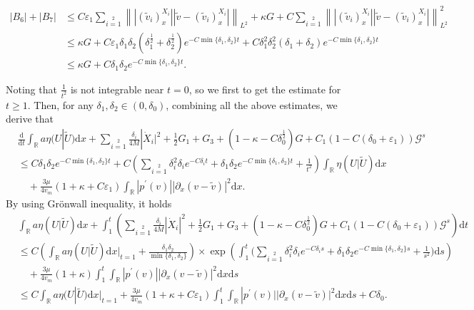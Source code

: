 \documentclass[10pt,reqno]{amsart}
\numberwithin{equation}{section}
\newcommand{\dif}{\mathrm{d}}
\begin{document}
\begin{align*}
|B_6|+|B_7|
&\le C\varepsilon_1\sum\limits_{i=1}\limits^2
\left\||(\widetilde{v}_i)^{X_i}_x||\widetilde{v}-(\widetilde{v}_i)^{X_i}_x|\right\|_{L^2}
+\kappa G+C\sum\limits_{i=1}\limits^2
\left\||(\widetilde{v}_i)^{X_i}_x||\widetilde{v}-(\widetilde{v}_i)^{X_i}_x|\right\|_{L^2}^2\\
&\le \kappa G+ C\varepsilon_1\delta_1\delta_2(\delta_1^{\frac{1}{2}}+\delta_2^{\frac{1}{2}})e^{-C\min\{\delta_1,\delta_2\}t}
+ C\delta_1^2\delta_2^2(\delta_1+\delta_2)e^{-C\min\{\delta_1,\delta_2\}t}\\
&\le \kappa G+ C\delta_1\delta_2e^{-C\min\{\delta_1,\delta_2\}t}.
\end{align*}

Noting that $\frac{1}{t^2}$ is not integrable near $t=0$, so we first to get the estimate for $t\ge 1$.  Then, for any $\delta_1, \delta_2\in(0, \delta_0)$, combining all the above estimates, we derive that
\begin{align*}
&\frac{\dif}{\dif t}\int_\mathbb{R}a\eta(U|\widetilde{U})\dif x
+\sum\limits_{i=1}\limits^2\frac{\delta_i}{4M}|\dot{X}_i|^2+\frac{1}{2}G_1+G_3
+(1-\kappa-C\delta^{\frac{1}{2}}_0)G
+C_1(1-C(\delta_0+\varepsilon_1))\mathcal{G}^s\\
&\le C\delta_1\delta_2e^{-C\min\{\delta_1,\delta_2\}t}
+C\left(\sum\limits_{i=1}\limits^2\delta_i^2\delta_ie^{-C\delta_i t}+\delta_1\delta_2e^{-C\min\{\delta_1,\delta_2\}t}+\frac{1}{t^2}\right)\int_{\mathbb{R}}\eta(U|\widetilde U)\dif x\\
&\quad+\frac{3\mu}{4v_m}(1+\kappa+C\varepsilon_1)\int_\mathbb{R}|p^\prime(v)||\partial_x(v-\widetilde{v})|^2\dif x.
\end{align*}
By using Gr\"onwall inequality, it holds
\begin{align*}
&\int_\mathbb{R}a\eta(U|\widetilde{U})\dif x
+\int_1^t\left(\sum\limits_{i=1}\limits^2\frac{\delta_i}{4M}|\dot{X}_i|^2+\frac{1}{2}G_1+G_3
+(1-\kappa-C\delta^{\frac{1}{2}}_0)G
+C_1(1-C(\delta_0+\varepsilon_1))\mathcal{G}^s\right)\dif t\\
&\le C\left(\int_{\mathbb{R}}a\eta(U|\widetilde U)\dif x\Big|_{t=1}+ \frac{\delta_1\delta_2}{\min\{\delta_1,\delta_2\}}\right)\times \exp\left(\int_1^t\Big(\sum\limits_{i=1}\limits^2\delta_i^2\delta_ie^{-C\delta_i s}+\delta_1\delta_2e^{-C\min\{\delta_1,\delta_2\}s}+\frac{1}{s^2}\Big)\dif s\right)\\
&\quad+\frac{3\mu}{4v_m}(1+\kappa)\int_1^t\int_\mathbb{R}|p^\prime(v)||\partial_x(v-\widetilde{v})|^2\dif x\dif s\\
&\le C\int_{\mathbb{R}}a\eta(U|\widetilde U)\dif x\Big|_{t=1}+\frac{3\mu}{4v_m}(1+\kappa+C\varepsilon_1)\int_1^t\int_\mathbb{R}|p^\prime(v)||\partial_x(v-\widetilde{v})|^2\dif x\dif s+C\delta_0.
\end{align*}
\end{document}
